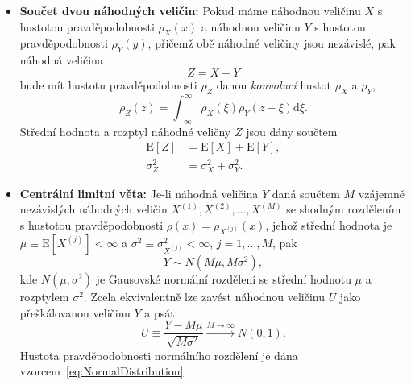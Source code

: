 \documentclass[a4paper,11pt,twoside]{article}
\renewcommand{\d}{\mathrm{d}}           %
\def\expectation#1{\mathrm{E}\left[#1\right]}
\def\dispersion#1{\sigma_{#1}^{2}}
\theoremstyle{red}
\theoremstyle{green}
\begin{document}
\begin{itemize}
            \item {\bf Součet dvou náhodných veličin:} 
                Pokud máme náhodnou veličinu $X$ s hustotou pravděpodobnosti $\rho_{X}(x)$ a náhodnou veličinu $Y$ s hustotou pravděpodobnosti $\rho_{Y}(y)$, přičemž obě náhodné veličiny jsou nezávislé, pak náhodná veličina
                \begin{equation}
                    Z=X+Y
                \end{equation}
                bude mít hustotu pravděpodobnosti $\rho_{Z}$ danou \emph{konvolucí} hustot $\rho_{X}$ a $\rho_{Y}$,
                \begin{equation}
                    \label{eq:SumDensity}
                    \rho_{Z}(z)=\int_{-\infty}^{\infty}\rho_{X}(\xi)\rho_{Y}(z-\xi)\d\xi.
                \end{equation}
                Střední hodnota a rozptyl náhodné veličny $Z$ jsou dány součtem 
                \begin{align}
                    \expectation{Z}&=\expectation{X}+\expectation{Y},\nonumber\\
                    \dispersion{Z}&=\dispersion{X}+\dispersion{Y}.
                \end{align}

            \item {\bf Centrální limitní věta:}
                Je-li náhodná veličina $Y$ daná součtem $M$ vzájemně nezávislých náhodných veličin $X^{(1)},X^{(2)},\dotsc,X^{(M)}$ se shodným rozdělením s hustotou pravděpodobnosti $\rho(x)=\rho_{X^{(j)}}(x)$, jehož střední hodnota je $\mu\equiv\expectation{X^{(j)}}<\infty$ a $\sigma^{2}\equiv\dispersion{X^{(j)}}<\infty$, $j=1,\dotsc,M$,
                pak 
                \begin{equation}
                    \label{eq:CLT}
                    Y\sim N(M\mu,M\sigma^{2}),
                \end{equation}
                kde $N(\mu,\sigma^{2})$ je Gausovské normální rozdělení se střední hodnotu $\mu$ a rozptylem $\sigma^{2}$.
                Zcela ekvivalentně lze zavést náhodnou veličinu $U$ jako přeškálovanou veličinu $Y$ a psát
                \begin{equation}
                    \label{eq:CLT1}
                    U\equiv\frac{Y-M\mu}{\sqrt{M\sigma^{2}}}\xrightarrow{M\rightarrow\infty}N(0,1).
                \end{equation}
                Hustota pravděpodobnosti normálního rozdělení je dána vzorcem~\eqref{eq:NormalDistribution}.
        \end{itemize}
\end{document}
